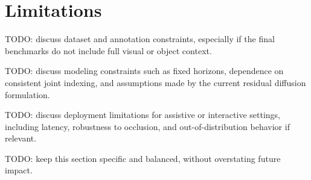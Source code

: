 \section{Limitations}

TODO: discuss dataset and annotation constraints, especially if the final benchmarks do not include full visual or object context.

TODO: discuss modeling constraints such as fixed horizons, dependence on consistent joint indexing, and assumptions made by the current residual diffusion formulation.

TODO: discuss deployment limitations for assistive or interactive settings, including latency, robustness to occlusion, and out-of-distribution behavior if relevant.

TODO: keep this section specific and balanced, without overstating future impact.
